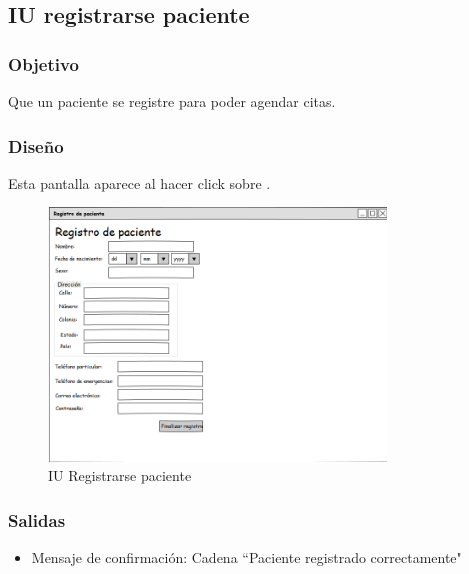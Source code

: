 \subsection{IU registrarse paciente}

\subsubsection{Objetivo}
Que un paciente se registre para poder agendar citas.

\subsubsection{Diseño}
Esta pantalla aparece al hacer click sobre .

\begin{figure}[htbp!]
	\centering
	\includegraphics[width=0.8\textwidth]{images/IU_registrarse_paciente}
	\caption{IU Registrarse paciente}
\end{figure}


\subsubsection{Salidas}
\begin{itemize} 
	\item Mensaje de confirmación: Cadena ``Paciente registrado correctamente"
\end{itemize}
